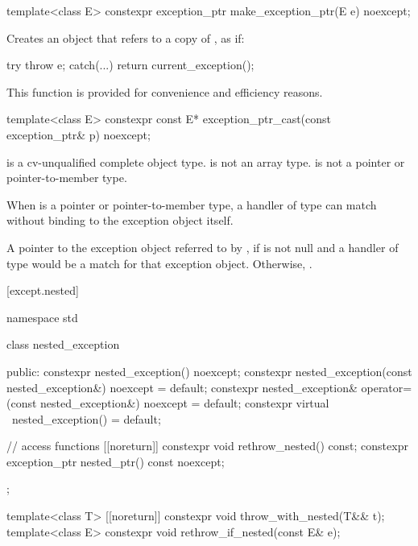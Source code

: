 %
\begin{itemdecl}
template<class E> constexpr exception_ptr make_exception_ptr(E e) noexcept;
\end{itemdecl}

\begin{itemdescr}
\pnum
\effects
Creates an  object that refers to a copy of , as if:
\begin{codeblock}
try {
  throw e;
} catch(...) {
  return current_exception();
}
\end{codeblock}

\pnum
\begin{note}
This function is provided for convenience and
efficiency reasons.
\end{note}
\end{itemdescr}

%
\begin{itemdecl}
template<class E> constexpr const E* exception_ptr_cast(const exception_ptr& p) noexcept;
\end{itemdecl}

\begin{itemdescr}
\pnum
\mandates
{} is a cv-unqualified complete object type.
 is not an array type.
 is not a pointer or pointer-to-member type.
\begin{note}
When  is a pointer or pointer-to-member type,
a handler of type  can match
without binding to the exception object itself.
\end{note}

\pnum
\returns
A pointer to the exception object referred to by ,
if  is not null and
a handler of type 
would be a match for that exception object.
Otherwise, .
\end{itemdescr}

[except.nested]{}

%
\begin{codeblock}
namespace std {
  class nested_exception {
  public:
    constexpr nested_exception() noexcept;
    constexpr nested_exception(const nested_exception&) noexcept = default;
    constexpr nested_exception& operator=(const nested_exception&) noexcept = default;
    constexpr virtual ~nested_exception() = default;

    // access functions
    [[noreturn]] constexpr void rethrow_nested() const;
    constexpr exception_ptr nested_ptr() const noexcept;
  };

  template<class T> [[noreturn]] constexpr void throw_with_nested(T&& t);
  template<class E> constexpr void rethrow_if_nested(const E& e);
}
\end{codeblock}

